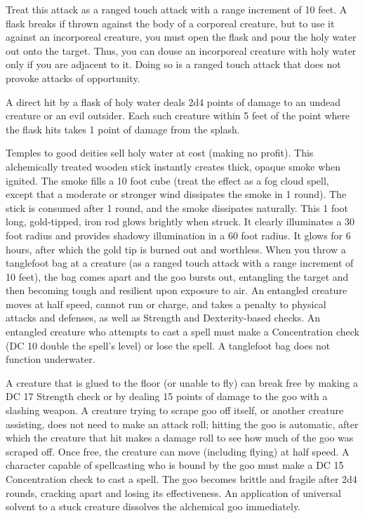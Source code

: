 \par Treat this attack as a ranged touch attack with a range increment of 10 feet. A flask breaks if thrown against the body of a corporeal creature, but to use it against an incorporeal creature, you must open the flask and pour the holy water out onto the target. Thus, you can douse an incorporeal creature with holy water only if you are adjacent to it. Doing so is a ranged touch attack that does not provoke attacks of opportunity.
\par A direct hit by a flask of holy water deals 2d4 points of damage to an undead creature or an evil outsider. Each such creature within 5 feet of the point where the flask hits takes 1 point of damage from the splash.
\par Temples to good deities sell holy water at cost (making no profit).
 This alchemically treated wooden stick instantly creates thick, opaque smoke when ignited. The smoke fills a 10 foot cube (treat the effect as a fog cloud spell, except that a moderate or stronger wind dissipates the smoke in 1 round). The stick is consumed after 1 round, and the smoke dissipates naturally.
 This 1 foot long, gold-tipped, iron rod glows brightly when struck. It clearly illuminates a 30 foot radius and provides shadowy illumination in a 60 foot radius. It glows for 6 hours, after which the gold tip is burned out and worthless.
 When you throw a tanglefoot bag at a creature (as a ranged touch attack with a range increment of 10 feet), the bag comes apart and the goo bursts out, entangling the target and then becoming tough and resilient upon exposure to air. An entangled creature moves at half speed, cannot run or charge, and takes a  penalty to physical attacks and defenses, as well as Strength and Dexterity-based checks. An entangled creature who attempts to cast a spell must make a Concentration check (DC 10 \add double the spell's level) or lose the spell. A tanglefoot bag does not function underwater.
\par A creature that is glued to the floor (or unable to fly) can break free by making a DC 17 Strength check or by dealing 15 points of damage to the goo with a slashing weapon. A creature trying to scrape goo off itself, or another creature assisting, does not need to make an attack roll; hitting the goo is automatic, after which the creature that hit makes a damage roll to see how much of the goo was scraped off. Once free, the creature can move (including flying) at half speed. A character capable of spellcasting who is bound by the goo must make a DC 15 Concentration check to cast a spell. The goo becomes brittle and fragile after 2d4 rounds, cracking apart and losing its effectiveness. An application of universal solvent to a stuck creature dissolves the alchemical goo immediately.
